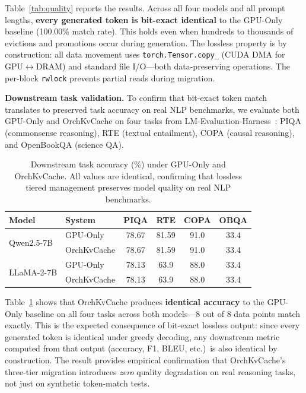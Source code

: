 \documentclass[conference]{IEEEtran}
\begin{document}
Table~\ref{tab:quality} reports the results. Across all four models and all prompt lengths, \textbf{every generated token is bit-exact identical} to the GPU-Only baseline (100.00\% match rate). This holds even when hundreds to thousands of evictions and promotions occur during generation. The lossless property is by construction: all data movement uses \texttt{torch.Tensor.copy\_} (CUDA DMA for GPU$\leftrightarrow$DRAM) and standard file I/O---both data-preserving operations. The per-block \texttt{rwlock} prevents partial reads during migration.

\textbf{Downstream task validation.} To confirm that bit-exact token match translates to preserved task accuracy on real NLP benchmarks, we evaluate both GPU-Only and OrchKvCache on four tasks from LM-Evaluation-Harness~\cite{lm-eval}: PIQA (commonsense reasoning), RTE (textual entailment), COPA (causal reasoning), and OpenBookQA (science QA).

\begin{table}[t]
\centering
\caption{Downstream task accuracy (\%) under GPU-Only and OrchKvCache. All values are identical, confirming that lossless tiered management preserves model quality on real NLP benchmarks.}
\label{tab:lm-eval}
\small
\begin{tabular}{@{}llcccc@{}}
\toprule
Model & System & PIQA & RTE & COPA & OBQA \\
\midrule
\multirow{2}{*}{Qwen2.5-7B}
  & GPU-Only    & 78.67 & 81.59 & 91.0 & 33.4 \\
  & OrchKvCache & 78.67 & 81.59 & 91.0 & 33.4 \\
\midrule
\multirow{2}{*}{LLaMA-2-7B}
  & GPU-Only    & 78.13 & 63.9 & 88.0 & 33.4 \\
  & OrchKvCache & 78.13 & 63.9 & 88.0 & 33.4 \\
\bottomrule
\end{tabular}
\end{table}

Table~\ref{tab:lm-eval} shows that OrchKvCache produces \textbf{identical accuracy} to the GPU-Only baseline on all four tasks across both models---8 out of 8 data points match exactly. This is the expected consequence of bit-exact lossless output: since every generated token is identical under greedy decoding, any downstream metric computed from that output (accuracy, F1, BLEU, etc.)\ is also identical by construction. The result provides empirical confirmation that OrchKvCache's three-tier migration introduces \emph{zero} quality degradation on real reasoning tasks, not just on synthetic token-match tests.
\end{document}
